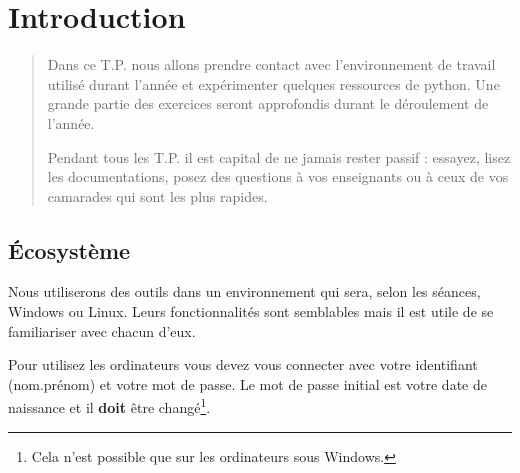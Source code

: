 \chapter{Introduction}
\thispagestyle{empty}
\begin{abstract} Dans ce T.P. nous allons prendre contact avec l'environnement de travail utilisé durant l'année et expérimenter quelques ressources de python. Une grande partie des exercices seront approfondis durant le déroulement de l'année.

Pendant tous les T.P. il est capital de ne jamais rester passif : essayez, lisez les documentations, posez des questions à vos enseignants ou à ceux de vos camarades qui sont les plus rapides.
\end{abstract}
\section{Écosystème} 
Nous utiliserons des outils dans un environnement qui sera, selon les séances, Windows ou Linux. Leurs fonctionnalités sont semblables mais il est utile de se familiariser avec chacun d'eux.

Pour utilisez les ordinateurs vous devez vous connecter avec votre identifiant (nom.prénom) et votre mot de passe. Le mot de passe initial est votre date de naissance et il {\bf doit} être changé\footnote{Cela n'est possible que sur les ordinateurs sous Windows.}.
